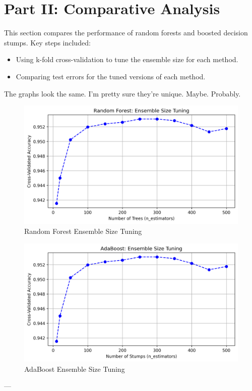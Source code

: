 \documentclass[12pt]{article}
\begin{document}
\section{Part II: Comparative Analysis}
This section compares the performance of random forests and boosted decision stumps. Key steps included:
\begin{itemize}
    \item Using k-fold cross-validation to tune the ensemble size for each method.
    \item Comparing test errors for the tuned versions of each method.
\end{itemize}
The graphs look the same. I'm pretty sure they're unique. Maybe. Probably.

\begin{figure}[h!]
    \centering
    \includegraphics[width=0.8\linewidth]{figures/k-fold/ensemble_size_tuning.png}
    \caption{Random Forest Ensemble Size Tuning}
    \label{fig:kf}
\end{figure}

\begin{figure}[h!]
    \centering
    \includegraphics[width=0.8\linewidth]{figures/k-fold/ada_ensemble_size_tuning.png}
    \caption{AdaBoost Ensemble Size Tuning}
    \label{fig:old}
\end{figure}

---
\end{document}

